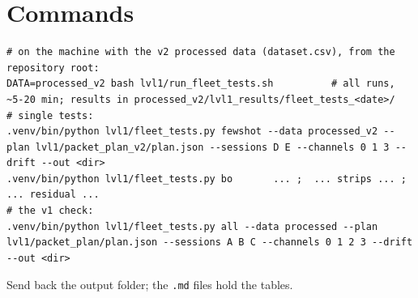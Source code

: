 \documentclass[11pt]{article}
\begin{document}
\section{Commands}
\begin{Verbatim}
# on the machine with the v2 processed data (dataset.csv), from the repository root:
DATA=processed_v2 bash lvl1/run_fleet_tests.sh          # all runs, ~5-20 min; results in processed_v2/lvl1_results/fleet_tests_<date>/
# single tests:
.venv/bin/python lvl1/fleet_tests.py fewshot --data processed_v2 --plan lvl1/packet_plan_v2/plan.json --sessions D E --channels 0 1 3 --drift --out <dir>
.venv/bin/python lvl1/fleet_tests.py bo       ... ;  ... strips ... ;  ... residual ...
# the v1 check:
.venv/bin/python lvl1/fleet_tests.py all --data processed --plan lvl1/packet_plan/plan.json --sessions A B C --channels 0 1 2 3 --drift --out <dir>
\end{Verbatim}
Send back the output folder; the \texttt{.md} files hold the tables.
\end{document}
